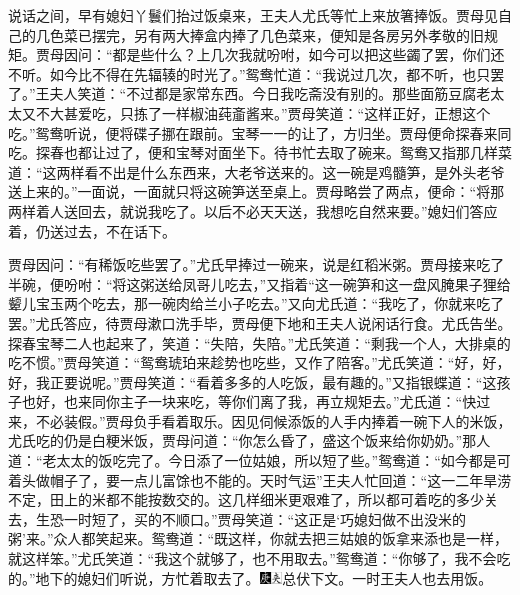 说话之间，早有媳妇丫鬟们抬过饭桌来，王夫人尤氏等忙上来放箸捧饭。贾母见自己的几色菜已摆完，另有两大捧盒内捧了几色菜来，便知是各房另外孝敬的旧规矩。贾母因问：“都是些什么？上几次我就吩咐，如今可以把这些蠲了罢，你们还不听。如今比不得在先辐辏的时光了。”鸳鸯忙道：“我说过几次，都不听，也只罢了。”王夫人笑道：“不过都是家常东西。今日我吃斋没有别的。那些面筋豆腐老太太又不大甚爱吃，只拣了一样椒油莼齑酱来。”贾母笑道：“这样正好，正想这个吃。”鸳鸯听说，便将碟子挪在跟前。宝琴一一的让了，方归坐。贾母便命探春来同吃。探春也都让过了，便和宝琴对面坐下。待书忙去取了碗来。鸳鸯又指那几样菜道：“这两样看不出是什么东西来，大老爷送来的。这一碗是鸡髓笋，是外头老爷送上来的。”一面说，一面就只将这碗笋送至桌上。贾母略尝了两点，便命：“将那两样着人送回去，就说我吃了。以后不必天天送，我想吃自然来要。”媳妇们答应着，仍送过去，不在话下。

贾母因问：“有稀饭吃些罢了。”尤氏早捧过一碗来，说是红稻米粥。贾母接来吃了半碗，便吩咐：“将这粥送给凤哥儿吃去，”又指着“这一碗笋和这一盘风腌果子狸给颦儿宝玉两个吃去，那一碗肉给兰小子吃去。”又向尤氏道：“我吃了，你就来吃了罢。”尤氏答应，待贾母漱口洗手毕，贾母便下地和王夫人说闲话行食。尤氏告坐。探春宝琴二人也起来了，笑道：“失陪，失陪。”尤氏笑道：“剩我一个人，大排桌的吃不惯。”贾母笑道：“鸳鸯琥珀来趁势也吃些，又作了陪客。”尤氏笑道：“好，好，好，我正要说呢。”贾母笑道：“看着多多的人吃饭，最有趣的。”又指银蝶道：“这孩子也好，也来同你主子一块来吃，等你们离了我，再立规矩去。”尤氏道：“快过来，不必装假。”贾母负手看着取乐。因见伺候添饭的人手内捧着一碗下人的米饭，尤氏吃的仍是白粳米饭，贾母问道：“你怎么昏了，盛这个饭来给你奶奶。”那人道：“老太太的饭吃完了。今日添了一位姑娘，所以短了些。”鸳鸯道：“{如今都是可着头做帽子了，要一点儿富馀也不能的。}{天时气运}”王夫人忙回道：“这一二年旱涝不定，田上的米都不能按数交的。这几样细米更艰难了，所以都可着吃的多少关去，生恐一时短了，买的不顺口。”贾母笑道：“这正是‘巧媳妇做不出没米的粥’来。”众人都笑起来。鸳鸯道：“既这样，你就去把三姑娘的饭拿来添也是一样，就这样笨。”尤氏笑道：“我这个就够了，也不用取去。”鸳鸯道：“你够了，我不会吃的。”地下的媳妇们听说，方忙着取去了。{\includegraphics[width=3mm]{../Images/00004}\includegraphics[width=3mm]{../Images/00012}\footnotesize \kaishu 总伏下文。}一时王夫人也去用饭。

